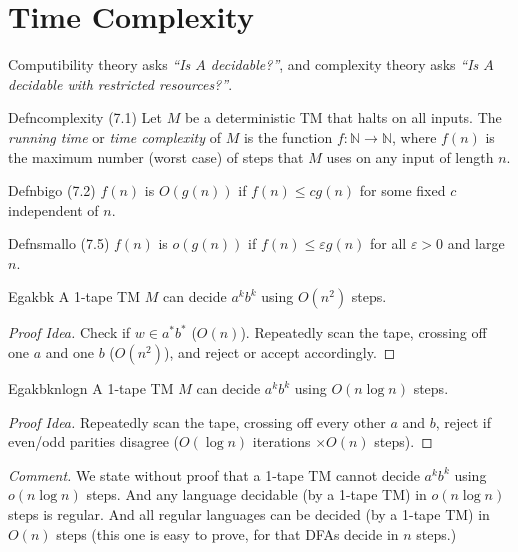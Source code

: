 \chapter{Time Complexity}

Computibility theory asks \textit{``Is $A$ decidable?''}, and complexity theory asks \textit{``Is $A$ decidable with restricted resources?''}.

\begin{reference}{Defn}{complexity}
  (7.1) Let \( M \) be a deterministic TM that halts on all inputs. The \emph{running time} or \emph{time complexity} of \( M \) is the function \( f : \mathbb{N} \rightarrow \mathbb{N} \), where \( f(n) \) is the maximum number (worst case) of steps that \( M \) uses on any input of length \( n \).
\end{reference}

\begin{reference}{Defn}{bigo}
  (7.2) $f(n)$ is $O(g(n))$ if $f(n)\leq cg(n)$ for some fixed $c$ independent of $n$.
\end{reference}

\begin{reference}{Defn}{smallo}
  (7.5) $f(n)$ is $o(g(n))$ if $f(n)\leq \varepsilon g(n)$ for all $\varepsilon>0$ and large $n$.
\end{reference}

\begin{reference}{Eg}{akbk}
  A 1-tape TM $M$ can decide $a^kb^k$ using $O(n^2)$ steps.
\end{reference}

\begin{proof}[Proof Idea]
  Check if $w\in a^*b^*$ ($O(n)$). Repeatedly scan the tape, crossing off one $a$ and one $b$ ($O(n^2)$), and reject or accept accordingly.
\end{proof}

\begin{reference}{Eg}{akbknlogn}
  A 1-tape TM $M$ can decide $a^kb^k$ using $O(n\log n)$ steps.
\end{reference}

\begin{proof}[Proof Idea]
  Repeatedly scan the tape, crossing off every other $a$ and $b$, reject if even/odd parities disagree ($O(\log n)$ iterations $\times O(n)$ steps).
\end{proof}

\textit{Comment.} We state without proof that a 1-tape TM cannot decide $a^kb^k$ using $o(n\log n)$ steps. And any language decidable (by a 1-tape TM) in $o(n\log n)$ steps is regular. And all regular languages can be decided (by a 1-tape TM) in $O(n)$ steps (this one is easy to prove, for that DFAs decide in $n$ steps.)

